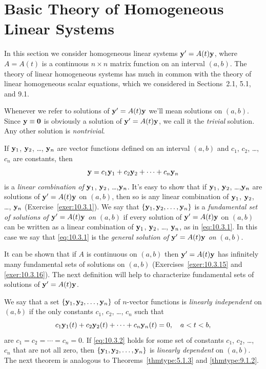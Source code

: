 \section{Basic Theory of Homogeneous Linear Systems}

\noindent
In this section we consider homogeneous linear systems ${\bf y}'= A(t){\bf y}$, where $A=A(t)$ is a
continuous $n\times n$ matrix function on an interval $(a,b)$. The theory of linear homogeneous
systems has much in common with the theory of linear homogeneous scalar equations, which we
considered in Sections~2.1, 5.1, and 9.1.

Whenever we refer to solutions of ${\bf y}'=A(t){\bf y}$ we'll mean solutions on $(a,b)$. Since
${\bf y}\equiv{\bf0}$ is obviously a solution of ${\bf y}'=A(t){\bf y}$, we call it the
{\color{blue}\it trivial\/} solution. Any other solution is {\color{blue}\it nontrivial\/}.

If ${\bf y}_{1}$, ${\bf y}_{2}$, \dots, ${\bf y}_{n}$ are vector functions defined on an interval
$(a,b)$ and $c_{1}$, $c_{2}$, \dots, $c_{n}$ are constants, then
\begin{equation}
  \label{eq:10.3.1}{\bf y}=c_{1}{\bf y}_{1}+c_{2}{\bf y}_{2}+\cdots+c_{n}{\bf y}_{n}
\end{equation}
is a {\color{blue}\it linear combination of\/} ${\bf y}_{1}$, ${\bf y}_{2}$, \ldots,${\bf y}_{n}$.
It's easy to show that if ${\bf y}_{1}$, ${\bf y}_{2}$, \dots,${\bf y}_{n}$ are solutions of
${\bf y}'=A(t){\bf y}$ on $(a,b)$, then so is any linear combination of ${\bf y}_{1}$,
${\bf y}_{2}$, \dots, ${\bf y}_{n}$ (Exercise~\ref{exer:10.3.1}). We say that
$\{{\bf y}_{1},{\bf y}_{2},\dots,{\bf y}_{n}\}$ is a {\color{blue}\it fundamental set of solutions
of ${\bf y}'=A(t){\bf y}$ on\/} $(a,b)$ if every solution of ${\bf y}'=A(t){\bf y}$ on $(a,b)$
can be written as a linear combination of ${\bf y}_{1}$, ${\bf y}_{2}$, \dots, ${\bf y}_{n}$, as in
\eqref{eq:10.3.1}. In this case we say that \eqref{eq:10.3.1} is the {\color{blue}\it general
solution of ${\bf y}'=A(t){\bf y}$ on\/} $(a,b)$.

It can be shown that if $A$ is continuous on $(a,b)$ then ${\bf y}'=A(t){\bf y}$ has infinitely many
fundamental sets of solutions on $(a,b)$ (Exercises~\ref{exer:10.3.15} and \ref{exer:10.3.16}). The
next definition will help to characterize fundamental sets of solutions of ${\bf y}'=A(t){\bf y}$.

We say that a set $\{{\bf y}_{1},{\bf y}_{2},\dots,{\bf y}_{n}\}$ of $n$-vector functions is
{\color{blue}\it linearly independent\/} on $(a,b)$ if the only constants $c_{1}$, $c_{2}$, \dots,
$c_{n}$ such that
\begin{equation}
  \label{eq:10.3.2}c_{1}{\bf y}_{1}(t)+c_{2}{\bf y}_{2}(t)+\cdots+c_{n}{\bf y}_{n}(t)=0,\quad a<t<b,
\end{equation}
are $c_{1}=c_{2}=\cdots=c_{n}=0$. If \eqref{eq:10.3.2} holds for some set of constants $c_{1}$,
$c_{2}$, \dots, $c_{n}$ that are not all zero, then $\{{\bf y}_{1},{\bf y}_{2},\dots,{\bf y}_{n}\}$
is {\color{blue}\it linearly dependent\/} on $(a,b)$.
The next theorem is analogous to Theorems~\ref{thmtype:5.1.3} and \ref{thmtype:9.1.2}.

